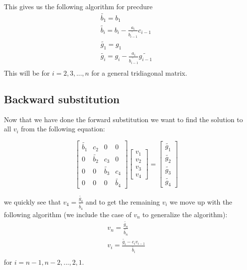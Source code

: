 \documentclass[english,notitlepage]{article}  %
\begin{document}
This gives us the following algorithm for precdure
\begin{gather}\label{eq:for}
    \tilde{b_1} = b_1 \\
    \tilde{b_i} = b_i - \frac{a_i}{\tilde{b_{i-1}}}c_{i-1}\\\label{line:for_b}
    \tilde{g_1} = g_1 \\
    \tilde{g_i} = g_i - \frac{a_i}{\tilde{b_{i-1}}}\tilde{g_{i-1}}\\\label{line:for_g}
\end{gather}
This will be for $i = 2, 3, ..., n$ for a general tridiagonal matrix.

\subsection*{Backward substitution}\label{sec:backward}

Now that we have done the forward substitution we want to find the solution to all $v_i$ from the following equation:

\begin{equation}
    \begin{bmatrix}
        \tilde{b_1} & c_2 & 0 & 0 \\
        0 & \tilde{b_2} & c_3 & 0 \\
        0 & 0 & \tilde{b_3} & c_4 \\
        0 & 0 & 0 & \tilde{b_4}
    \end{bmatrix} \begin{bmatrix}
        v_1\\
        v_2\\
        v_3\\
        v_4
    \end{bmatrix} = \begin{bmatrix}
        \tilde{g_1}\\
        \tilde{g_2}\\
        \tilde{g_3}\\
        \tilde{g_4}
    \end{bmatrix}
\end{equation}

we quickly see that $v_4 = \frac{\tilde{g_4}}{\tilde{b_4}}$ and to get the remaining $v_i$ we move up with the following algorithm (we include the case of $v_n$ to generalize the algorithm):
\begin{gather}\label{eq:back}
    v_n = \frac{\tilde{g_n}}{\tilde{b_n}}\\
    v_i = \frac{\tilde{g_i} - c_iv_{i-1}}{\tilde{b_i}}\\
\end{gather}
for $i = n-1, n-2, ..., 2, 1$.
\end{document}
